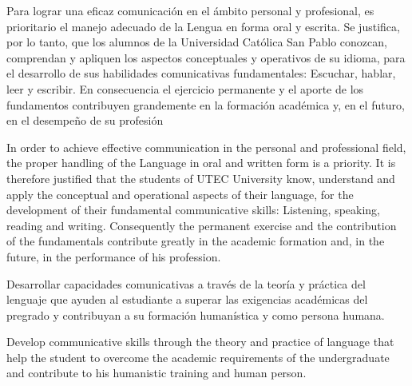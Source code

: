 \begin{syllabus}


\begin{justification}
Para lograr una eficaz comunicación en el ámbito personal y profesional, es prioritario el manejo adecuado de la Lengua en forma oral y escrita. Se justifica, por lo tanto, que los alumnos de la Universidad Católica San Pablo conozcan, comprendan y apliquen los aspectos conceptuales y operativos de su idioma, para el desarrollo de sus habilidades comunicativas fundamentales: Escuchar, hablar, leer y escribir.
En consecuencia el ejercicio permanente y el aporte de los fundamentos contribuyen grandemente en la formación académica y, en el futuro, en el desempeño de su profesión

In order to achieve effective communication in the personal and professional field, the proper handling of the Language in oral and written form is a priority. It is therefore justified that the students of UTEC University know, understand and apply the conceptual and operational aspects of their language, for the development of their fundamental communicative skills: Listening, speaking, reading and writing.
Consequently the permanent exercise and the contribution of the fundamentals contribute greatly in the academic formation and, in the future, in the performance of his profession.
\end{justification}

\begin{goals}
\item Desarrollar capacidades comunicativas a través de la teoría y práctica del lenguaje que ayuden al estudiante a superar las exigencias académicas del pregrado y contribuyan a su formación humanística y como persona humana.

\item Develop communicative skills through the theory and practice of language that help the student to overcome the academic requirements of the undergraduate and contribute to his humanistic training and human person.
\end{goals}

\begin{outcomes}
    \item {}
    \item {}
\end{outcomes}

\begin{competences}
    \item {}
\end{competences}


\end{syllabus}
